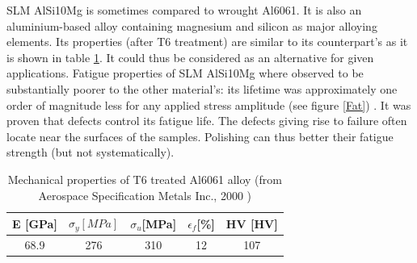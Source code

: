  \begin{center}
\begin{table}[ht]
\noindent{}
\caption[Mechanical properties for different plate pre heating temperatures (from Wang et al., 2018) \parencite{Wang2018}.]{Mechanical properties for different plate pre heating temperatures (from Wang et al., 2018) \parencite{Wang2018}.}
\label{tab:Wang}
\end{table}
 \end{center}

SLM AlSi10Mg is sometimes compared to wrought Al6061. It is also an aluminium-based alloy containing magnesium and silicon as major alloying elements. Its properties (after T6 treatment) are similar to its counterpart's as it is shown in table \ref{tab:6061}. It could thus be considered as an alternative for given applications. Fatigue properties of SLM AlSi10Mg where observed to be substantially poorer to the other material's: its lifetime was approximately one order of magnitude less for any applied stress amplitude (see figure \ref{Fat}) \parencite{MOWER2016198}. It was proven that defects control its fatigue life. The defects giving rise to failure often locate near the surfaces of the samples. Polishing can thus better their fatigue strength (but not systematically). \\

 \begin{center}
\begin{table}[ht]
\centering
\begin{tabular}{|c|c|c|c|c|}
    \hline
    E [GPa] &$\sigma_y [MPa]$ &$\sigma_u$[MPa]&$\epsilon_f$[\%]&HV [HV] \\
\hline
\hline   
    68.9 &276  & 310 &12 &107	\\
    \hline

\end{tabular}
\caption[Mechanical properties of T6 treated Al6061 alloy]{Mechanical properties of T6 treated Al6061 alloy (from Aerospace Specification Metals Inc., 2000 \parencite{6061}) }
\label{tab:6061}
\end{table}
 \end{center}
 
